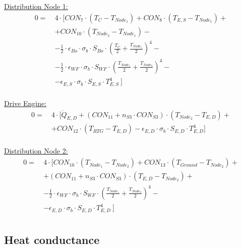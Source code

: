\underline{Distribution Node 1:}
\begin{equation}
\begin{aligned}
0=\  &  4\cdot [CON_7 \cdot (T_{C}-T_{Node_1})+CON_8 \cdot (T_{E,S}-T_{Node_1})+ \\[1em]
&   +CON_10 \cdot (T_{Node_2}-T_{Node_1}) - \\[1em]
&  - \frac{1}{2} \cdot \epsilon_{Bo}\cdot \sigma_b \cdot S_{Bo}\cdot \left( \frac{T_{C}}{2} +\frac{T_{Node_1}}{2}  \right)^4  - \\[1em]
& - \frac{1}{2} \cdot \epsilon_{WF}\cdot \sigma_b \cdot S_{WF}\cdot \left( \frac{T_{Node_1}}{2} +\frac{T_{Node_2}}{2}  \right)^4- \\[1em]
& -\epsilon_{E,S}\cdot \sigma_b \cdot S_{E,S}\cdot T_{E,S}^4\ ] \\[2em]
\end{aligned}
\end{equation}

\underline{Drive Engine:}
\begin{equation}
\begin{aligned}
0=\  &  4 \cdot [\dot{Q}_{E,D}+ (CON_{11}+n_{S3}\cdot CON_{S3}) \cdot (T_{Node_2}-T_{E,D})+ \\[1em]
&  + CON_{12} \cdot (T_{RTG}-T_{E,D})-\epsilon_{E,D}\cdot \sigma_b \cdot S_{E,D}\cdot T_{E,D}^4 ]  \\[2em]
\end{aligned}
\end{equation}

\underline{Distribution Node 2:}
\begin{equation}
\begin{aligned}
0=\ & 4 \cdot [CON_{10} \cdot (T_{Node_1}-T_{Node_2})+CON_{13} \cdot (T_{Ground}-T_{Node_2}) +   \\[1em]
&   +(CON_{11}+n_{S3}\cdot CON_{S3}) \cdot (T_{E,D}-T_{Node_2}) + \\[1em]
& - \frac{1}{2} \cdot \epsilon_{WF}\cdot \sigma_b \cdot S_{WF}\cdot \left( \frac{T_{Node_1}}{2} +\frac{T_{Node_2}}{2}  \right)^4- \\[1em]
& -\epsilon_{E,D}\cdot \sigma_b \cdot S_{E,D}\cdot T_{E,D}^4\ ] \\[2em]
\end{aligned}
\end{equation}
\clearpage

\subsection{Heat conductance} \label{sec:app_therm_2}

